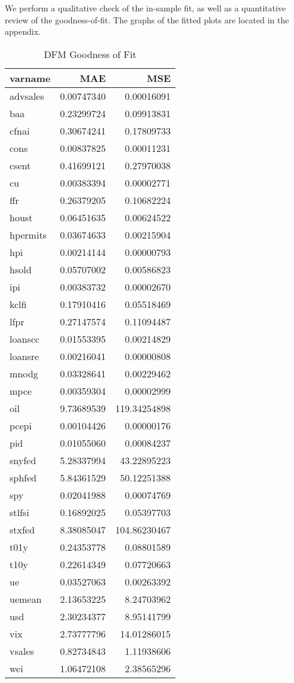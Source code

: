 \documentclass[11pt, letterpaper]{article}\usepackage[]{graphicx}\usepackage[]{color}
\begin{document}
We perform a qualitative check of the in-sample fit, as well as a quantitative review of the goodness-of-fit. The graphs of the fitted plots are located in the appendix.
\begin{table}[H]
\centering
\begingroup\footnotesize
\begin{tabular}{lrr}
  \hline
varname & MAE & MSE \\ 
  \hline
advsales & 0.00747340 & 0.00016091 \\ 
  baa & 0.23299724 & 0.09913831 \\ 
  cfnai & 0.30674241 & 0.17809733 \\ 
  cons & 0.00837825 & 0.00011231 \\ 
  csent & 0.41699121 & 0.27970038 \\ 
  cu & 0.00383394 & 0.00002771 \\ 
  ffr & 0.26379205 & 0.10682224 \\ 
  houst & 0.06451635 & 0.00624522 \\ 
  hpermits & 0.03674633 & 0.00215904 \\ 
  hpi & 0.00214144 & 0.00000793 \\ 
  hsold & 0.05707002 & 0.00586823 \\ 
  ipi & 0.00383732 & 0.00002670 \\ 
  kclfi & 0.17910416 & 0.05518469 \\ 
  lfpr & 0.27147574 & 0.11094487 \\ 
  loanscc & 0.01553395 & 0.00214829 \\ 
  loansre & 0.00216041 & 0.00000808 \\ 
  mnodg & 0.03328641 & 0.00229462 \\ 
  mpce & 0.00359304 & 0.00002999 \\ 
  oil & 9.73689539 & 119.34254898 \\ 
  pcepi & 0.00104426 & 0.00000176 \\ 
  pid & 0.01055060 & 0.00084237 \\ 
  snyfed & 5.28337994 & 43.22895223 \\ 
  sphfed & 5.84361529 & 50.12251388 \\ 
  spy & 0.02041988 & 0.00074769 \\ 
  stlfsi & 0.16892025 & 0.05397703 \\ 
  stxfed & 8.38085047 & 104.86230467 \\ 
  t01y & 0.24353778 & 0.08801589 \\ 
  t10y & 0.22614349 & 0.07720663 \\ 
  ue & 0.03527063 & 0.00263392 \\ 
  uemean & 2.13653225 & 8.24703962 \\ 
  usd & 2.30234377 & 8.95141799 \\ 
  vix & 2.73777796 & 14.01286015 \\ 
  vsales & 0.82734843 & 1.11938606 \\ 
  wei & 1.06472108 & 2.38565296 \\ 
   \hline
\end{tabular}
\endgroup
\caption{DFM Goodness of Fit} 
\end{table}
\end{document}

